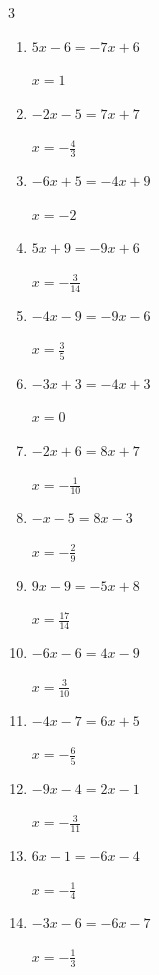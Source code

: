 \begin{multicols}{3}
\begin{enumerate}
  \item $5x-6=-7x+6$

        $\displaystyle x=1$

  \item $-2x-5=7x+7$

        $\displaystyle x=-\frac{4}{3}$

  \item $-6x+5=-4x+9$

        $\displaystyle x=-2$

  \item $5x+9=-9x+6$

        $\displaystyle x=-\frac{3}{14}$

  \item $-4x-9=-9x-6$

        $\displaystyle x=\frac{3}{5}$

  \item $-3x+3=-4x+3$

        $\displaystyle x=0$

  \item $-2x+6=8x+7$

        $\displaystyle x=-\frac{1}{10}$

  \item $-x-5=8x-3$

        $\displaystyle x=-\frac{2}{9}$

  \item $9x-9=-5x+8$

        $\displaystyle x=\frac{17}{14}$

  \item $-6x-6=4x-9$

        $\displaystyle x=\frac{3}{10}$

  \item $-4x-7=6x+5$

        $\displaystyle x=-\frac{6}{5}$

  \item $-9x-4=2x-1$

        $\displaystyle x=-\frac{3}{11}$

  \item $6x-1=-6x-4$

        $\displaystyle x=-\frac{1}{4}$

  \item $-3x-6=-6x-7$

        $\displaystyle x=-\frac{1}{3}$

\columnbreak %

\resetques


\end{enumerate}
\end{multicols}
